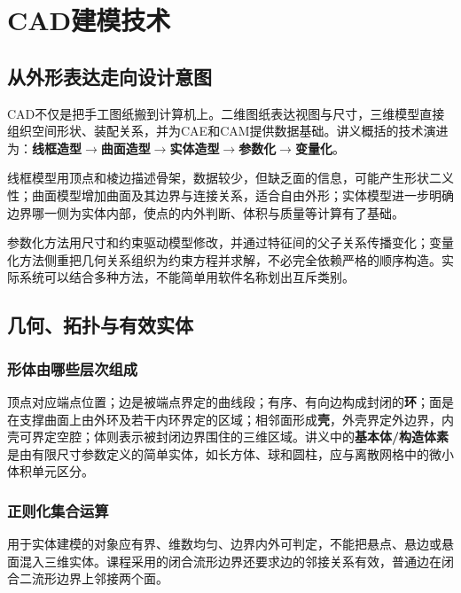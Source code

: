 \chapter{CAD建模技术}
\label{ch:cad-modeling}
\label{ch:modeling}

\section{从外形表达走向设计意图}
CAD不仅是把手工图纸搬到计算机上。二维图纸表达视图与尺寸，三维模型直接组织空间形状、装配关系，并为CAE和CAM提供数据基础。讲义概括的技术演进为：\textbf{线框造型$\to$曲面造型$\to$实体造型$\to$参数化$\to$变量化}。

线框模型用顶点和棱边描述骨架，数据较少，但缺乏面的信息，可能产生形状二义性；曲面模型增加曲面及其边界与连接关系，适合自由外形；实体模型进一步明确边界哪一侧为实体内部，使点的内外判断、体积与质量等计算有了基础。

参数化方法用尺寸和约束驱动模型修改，并通过特征间的父子关系传播变化；变量化方法侧重把几何关系组织为约束方程并求解，不必完全依赖严格的顺序构造。实际系统可以结合多种方法，不能简单用软件名称划出互斥类别。

\section{几何、拓扑与有效实体}
\subsection{形体由哪些层次组成}

顶点对应端点位置；边是被端点界定的曲线段；有序、有向边构成封闭的\textbf{环}；面是在支撑曲面上由外环及若干内环界定的区域；相邻面形成\textbf{壳}，外壳界定外边界，内壳可界定空腔；体则表示被封闭边界围住的三维区域。讲义中的\textbf{基本体/构造体素}是由有限尺寸参数定义的简单实体，如长方体、球和圆柱，应与离散网格中的微小体积单元区分。

\subsection{正则化集合运算}
用于实体建模的对象应有界、维数均匀、边界内外可判定，不能把悬点、悬边或悬面混入三维实体。课程采用的闭合流形边界还要求边的邻接关系有效，普通边在闭合二流形边界上邻接两个面。

